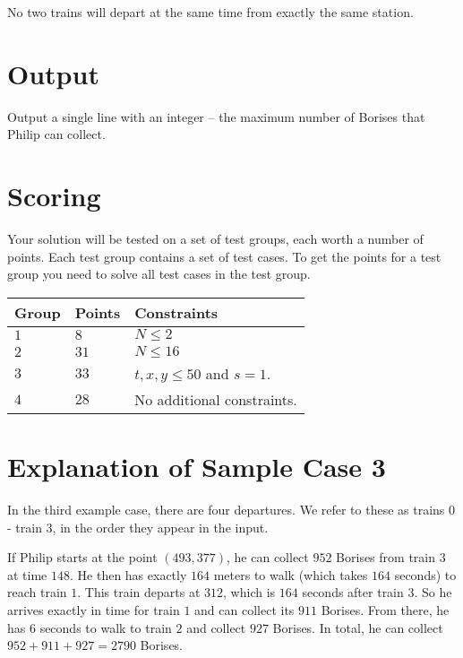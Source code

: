No two trains will depart at the same time from exactly the same station.

\section*{Output}
Output a single line with an integer -- the maximum number of Borises that Philip can collect.

\section*{Scoring}
Your solution will be tested on a set of test groups, each worth a number of points. Each test group contains
a set of test cases. To get the points for a test group you need to solve all test cases in the test group.

\noindent
\begin{tabular}{| l | l | l |}
  \hline
  \textbf{Group} & \textbf{Points} & \textbf{Constraints} \\ \hline
  $1$   & $8$        & $N \le 2$ \\ \hline
  $2$   & $31$       & $N \le 16$ \\ \hline
  $3$   & $33$       & $t, x, y \le 50$ and $s = 1$. \\ \hline
  $4$   & $28$       & No additional constraints. \\ \hline
\end{tabular}

\section*{Explanation of Sample Case 3}
In the third example case, there are four departures.
We refer to these as trains $0$ - train $3$, in the order they appear in the input.

If Philip starts at the point $(493,377)$, he can collect $952$ Borises from train $3$ at time $148$. He then has exactly $164$ meters to walk (which takes $164$ seconds) to reach train $1$. This train departs at $312$, which is $164$ seconds after train $3$.
So he arrives exactly in time for train $1$ and can collect its $911$ Borises. From there, he has $6$ seconds to walk to train $2$ and collect $927$ Borises. In total, he can collect $952 + 911 + 927 = 2790$ Borises.
